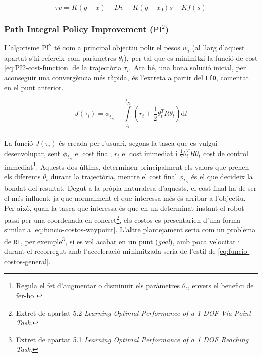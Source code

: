 \documentclass[12pt,a4paper,final,twoside]{article}
\begin{document}
\begin{equation}\label{eq:tau-v-dot-DMP-modified}
\tau \dot{v} = K(g - x) - Dv - K(g - x_0)s + K f(s)
\end{equation}


\subsubsection{Path Integral Policy Improvement ($\mathrm{PI^2}$)}

L'algorisme $\mathrm{PI^2}$ \cite{Stulp2011} té com a principal objectiu polir el pesos $w_i$ (al llarg d'aquest apartat s'hi refereix com paràmetres $\theta_t$), per tal que es minimitzi la funció de cost \eqref{eq:PI2-cost-function} de la trajectòria $\tau_i$. Ara bé, una bona solució inicial, per aconseguir una convergència més ràpida, és l'extreta a partir del \texttt{LfD}, comentat en el punt anterior.

\begin{equation}\label{eq:PI2-cost-function}
J(\tau_i) = \phi_{t_N} + \int\limits_{t_i}^{t_N} (r_t + \frac{1}{2} \theta_t^T R \theta_t) \mathrm{d}t
\end{equation}

\paragraph{}La funció $J(\tau_i)$ és creada per l'usuari, segons la tasca que es vulgui desenvolupar, sent $\phi_{t_N}$ el cost final, $r_t$ el cost immediat i $\frac{1}{2} \theta_t^T R \theta_t$ cost de control immediat\footnote{Regula el fet d'augmentar o disminuir els paràmetres $\theta_t$, envers el benefici de fer-ho \cite{Hennig2011}}. Aquests dos últims, determinen principalment els valors que prenen els diferents $\theta_t$ durant la trajectòria, mentre el cost final $\phi_{t_N}$ és el que decideix la bondat del resultat. Degut a la pròpia naturalesa d'aquests, el cost final ha de ser el més influent, ja que normalment el que interessa més és arribar a l'objectiu. Per això, quan la tasca que interessa és que en un determinat instant el robot passi per una coordenada en concret\footnote{Extret de \cite{Schaal2010} apartat 5.2 \textit{Learning Optimal Performance of a 1 DOF Via-Point Task}.}, els costos es presentarien d'una forma similar a \eqref{eq:funcio-costos-waypoint}. L'altre plantejament seria com un problema de \texttt{RL}, per exemple\footnote{Extret de \cite{Schaal2010} apartat 5.1 \textit{Learning Optimal Performance of a 1 DOF Reaching Task}.}, si es vol acabar en un punt (\textit{goal}), amb poca velocitat i durant el recorregut amb l'acceleració minimitzada seria de l'estil de \eqref{eq:funcio-costos-general}.
\end{document}
